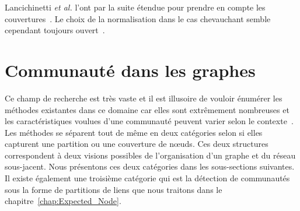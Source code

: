 Lancichinetti \emph{et al.} l'ont par la suite étendue pour prendre en compte les couvertures~\cite{Lancichinetti2009c}.
Le choix de la normalisation dans le cas chevauchant semble cependant toujours ouvert~\cite{McDaid2011,Zhang2015}.



\section{Communauté dans les graphes}
\label{sec:intro_communaute}

Ce champ de recherche est très vaste et il est illusoire de vouloir énumérer les méthodes existantes dans ce domaine car elles sont extrêmement nombreuses et les caractéristiques voulues d'une communauté peuvent varier selon le contexte~\cite{Leskovec2008,Coscia2011,Yang2015,Jeub2015}.
Les méthodes se séparent tout de même en deux catégories selon si elles capturent une partition ou une couverture de n\oe uds.
Ces deux structures correspondent à deux visions possibles de l'organisation d'un graphe et du réseau sous-jacent.
Nous présentons ces deux catégories dans les sous-sections suivantes.
Il existe également une troisième catégorie qui est la détection de communautés sous la forme de partitions de liens que nous traitons dans le chapitre~\ref{chap:Expected_Node}.

